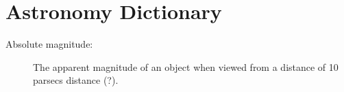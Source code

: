\chapter{Astronomy Dictionary}
		
		\begin{description}
			
			\item[Absolute magnitude:] The apparent magnitude of an object when viewed from a distance of 10 parsecs distance (?).
			
		\end{description}